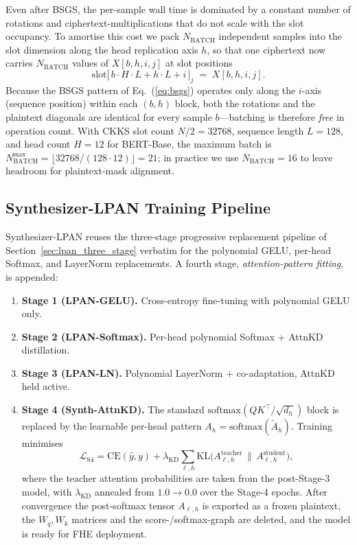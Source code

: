 Even after BSGS, the per-sample wall time is dominated by a constant number of rotations and ciphertext-multiplications that do not scale with the slot occupancy. To amortise this cost we pack $N_{\mathrm{BATCH}}$ independent samples into the slot dimension along the head replication axis $h$, so that one ciphertext now carries $N_{\mathrm{BATCH}}$ values of $X[b, h, i, j]$ at slot positions
\begin{equation}
\mathrm{slot}\bigl[\,b \cdot H \cdot L + h \cdot L + i\,\bigr]_{j} \;=\; X[b, h, i, j].
\label{eq:batched_packing}
\end{equation}
Because the BSGS pattern of Eq.~(\ref{eq:bsgs}) operates only along the $i$-axis (sequence position) within each $(b, h)$ block, both the rotations and the plaintext diagonals are identical for every sample $b$---batching is therefore \emph{free} in operation count. With CKKS slot count $N/2 = 32768$, sequence length $L = 128$, and head count $H = 12$ for BERT-Base, the maximum batch is $N_{\mathrm{BATCH}}^{\max} = \lfloor 32768 / (128 \cdot 12) \rfloor = 21$; in practice we use $N_{\mathrm{BATCH}} = 16$ to leave headroom for plaintext-mask alignment.

\subsection{Synthesizer-LPAN Training Pipeline}
\label{sec:slpan_training}

Synthesizer-LPAN reuses the three-stage progressive replacement pipeline of Section~\ref{sec:lpan_three_stage} verbatim for the polynomial GELU, per-head Softmax, and LayerNorm replacements. A fourth stage, \emph{attention-pattern fitting}, is appended:

\begin{enumerate}
    \item \textbf{Stage 1 (LPAN-GELU).} Cross-entropy fine-tuning with polynomial GELU only.
    \item \textbf{Stage 2 (LPAN-Softmax).} Per-head polynomial Softmax + AttnKD distillation.
    \item \textbf{Stage 3 (LPAN-LN).} Polynomial LayerNorm + co-adaptation, AttnKD held active.
    \item \textbf{Stage 4 (Synth-AttnKD).} The standard $\mathrm{softmax}(QK^\top/\sqrt{d_h})$ block is replaced by the learnable per-head pattern $A_h = \mathrm{softmax}(\tilde A_h)$. Training minimises
    \begin{equation}
    \mathcal{L}_{\mathrm{S4}} = \mathrm{CE}(\hat y, y) + \lambda_{\mathrm{KD}} \sum_{\ell, h} \mathrm{KL}\bigl(A_{\ell, h}^{\mathrm{teacher}} \,\|\, A_{\ell, h}^{\mathrm{student}}\bigr),
    \label{eq:s4_loss}
    \end{equation}
    where the teacher attention probabilities are taken from the post-Stage-3 model, with $\lambda_{\mathrm{KD}}$ annealed from $1.0 \to 0.0$ over the Stage-4 epochs. After convergence the post-softmax tensor $A_{\ell, h}$ is exported as a frozen plaintext, the $W_q, W_k$ matrices and the score-/softmax-graph are deleted, and the model is ready for FHE deployment.
\end{enumerate}

